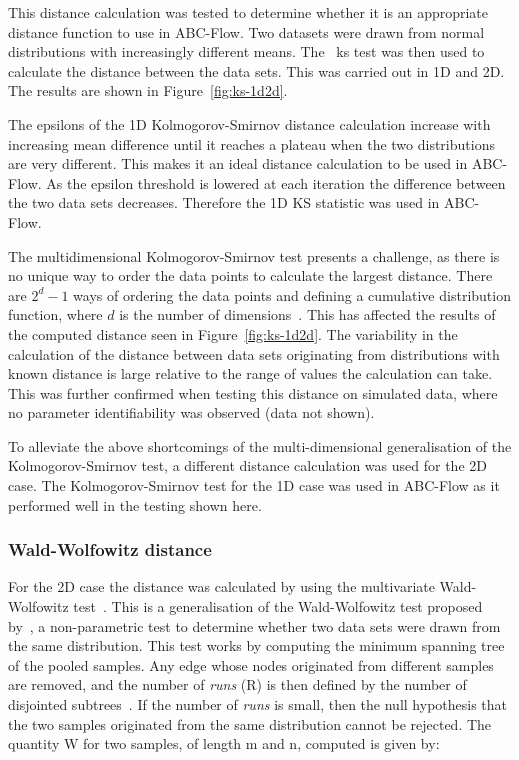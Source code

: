 This distance calculation was tested to determine whether it is an appropriate distance function to use in ABC-Flow. Two datasets were drawn from normal distributions with increasingly different means. The ~\acrshort{ks} test was then used to calculate the distance between the data sets. This was carried out in 1D and 2D. The results are shown in Figure~\ref{fig:ks-1d2d}.


The epsilons of the 1D Kolmogorov-Smirnov distance calculation increase with increasing mean difference until it reaches a plateau when the two distributions are very different. This makes it an ideal distance calculation to be used in ABC-Flow. As the epsilon threshold is lowered at each iteration the difference between the two data sets decreases. Therefore the 1D KS statistic was used in ABC-Flow. 


The multidimensional Kolmogorov-Smirnov test presents a challenge, as there is no unique way to order the data points to calculate the largest distance. There are  $2^d − 1$ ways of ordering the data points and defining a cumulative distribution function, where $d$ is the number of dimensions~\autocite{Lopes:2007vk}. This has affected the results of the computed distance seen in Figure~\ref{fig:ks-1d2d}. The variability in the calculation of the distance between data sets originating from distributions with known distance is large relative to the range of values the calculation can take. This was further confirmed when testing this distance on simulated data, where no parameter identifiability was observed (data not shown). 

To alleviate the above shortcomings of the multi-dimensional generalisation of the Kolmogorov-Smirnov test, a different distance calculation was used for the 2D case. The Kolmogorov-Smirnov test for the 1D case was used in ABC-Flow as it performed well in the testing shown here. 

\subsubsection{Wald-Wolfowitz distance}

For the 2D case the distance was calculated by using the multivariate Wald-Wolfowitz test~\autocite{Friedman:1979vm}. This is a generalisation of the Wald-Wolfowitz test proposed by~\autocite{Wald:1940wt}, a non-parametric test to determine whether two data sets were drawn from the same distribution. This test works by computing the minimum spanning tree of the pooled samples. Any edge whose nodes originated from different samples are removed, and the number of \textit{runs} (R) is then defined by the number of disjointed subtrees~\autocite{Friedman:1979vm}. If the number of \textit{runs} is small, then the null hypothesis that the two samples originated from the same distribution cannot be rejected. The quantity W for two samples, of length m and n, computed is given by: 
 
